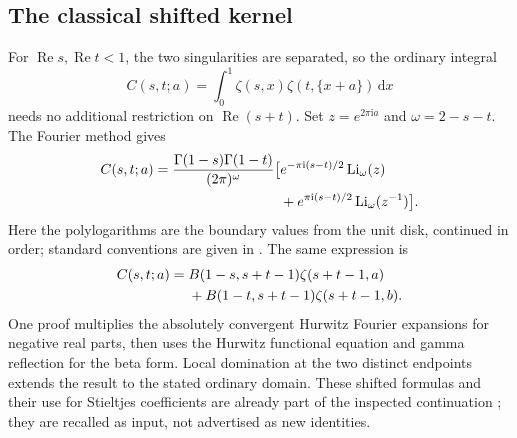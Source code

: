 \documentclass[11pt,a4paper]{article}
\numberwithin{equation}{section}
\theoremstyle{definition}
\newcommand{\dd}{\,\mathrm dx}
\newcommand{\ii}{\mathrm i}
\newcommand{\Li}{\operatorname{Li}}
\newcommand{\Rea}{\operatorname{Re}}
\begin{document}
\subsection{The classical shifted kernel}
For $\Rea s,\Rea t<1$, the two singularities are separated, so the ordinary integral
\[
C(s,t;a)=\int_0^1\zeta(s,x)\zeta(t,\{x+a\})\dd
\]
needs no additional restriction on $\Rea(s+t)$. Set $z=e^{2\pi\ii a}$ and $\omega=2-s-t$. The Fourier method gives
\begin{align}
C(s,t;a)=\frac{\Gamma(1-s)\Gamma(1-t)}{(2\pi)^\omega}
\big[&e^{-\pi\ii(s-t)/2}\Li_\omega(z)\notag\\
&+e^{\pi\ii(s-t)/2}\Li_\omega(z^{-1})\big].\label{csc:Cpoly}
\end{align}
Here the polylogarithms are the boundary values from the unit disk, continued in order; standard conventions are given in \cite{csc:DLMFpoly}. The same expression is
\begin{align}
C(s,t;a)={}&B(1-s,s+t-1)\zeta(s+t-1,a)\notag\\
&+B(1-t,s+t-1)\zeta(s+t-1,b).\label{csc:Cbeta}
\end{align}
One proof multiplies the absolutely convergent Hurwitz Fourier expansions for negative real parts, then uses the Hurwitz functional equation and gamma reflection for the beta form. Local domination at the two distinct endpoints extends the result to the stated ordinary domain. These shifted formulas and their use for Stieltjes coefficients are already part of the inspected continuation \cite{csc:shifted}; they are recalled as input, not advertised as new identities.
\end{document}
